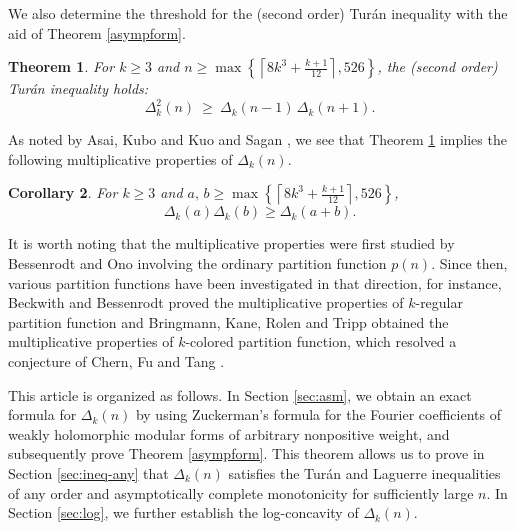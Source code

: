 \documentclass[12pt]{article}
\newtheorem{thm}{Theorem}[section]
\newtheorem{cor}[thm]{Corollary}
\numberwithin{equation}{section}
\begin{document}
We also determine the threshold
for the (second order) Tur\'an inequality with the aid of Theorem \ref{asympform}.
\begin{thm}\label{thm:main}
For $k\ge3$ and $
n\ge \max\left\{\left\lceil
8k^{3}+\frac{k+1}{12}\right\rceil,526\right\}
$, the (second order) Tur\'an inequality holds:
\[
\Delta_k^2(n)\ \ge\ \Delta_k(n-1)\,\Delta_k(n+1).
\]
\end{thm}


As noted by Asai, Kubo and Kuo \cite{Asai-Kubo-Kuo-00} and Sagan \cite{Sagan-1988}, we see that Theorem \ref{thm:main} implies the following multiplicative properties of $\Delta_{k}(n)$.

\begin{cor}\label{thm-Delta-2}
For $k\geq 3$ and   $a,\,b\ge \max\left\{\left\lceil
8k^{3}+\frac{k+1}{12}\right\rceil,526\right\}
$,
\begin{equation*}
\Delta_{k}(a)\Delta_{k}(b)\ge\Delta_{k}(a+b).
\end{equation*}
\end{cor}
It is worth noting that the multiplicative properties were first studied by Bessenrodt and Ono \cite{Bessenrodt-Ono-2016} involving the ordinary partition function $p(n)$. Since then, various partition functions have been investigated in that direction, for instance,
Beckwith and Bessenrodt  \cite{Beckwith-Bessenrodt-2016} proved the multiplicative properties of  $k$-regular partition function  and   Bringmann, Kane, Rolen and Tripp \cite{Bringmann-Kane-Rolen-Tripp-2021}  obtained the multiplicative properties of $k$-colored partition function, which resolved a conjecture of Chern, Fu and Tang \cite{Chern-Fu-Tang-2018}.



This article is organized as follows. In Section \ref{sec:asm}, we obtain an exact formula for $\Delta_{k}(n)$ by using Zuckerman's formula for the Fourier coefficients of weakly holomorphic modular forms of arbitrary nonpositive weight, and subsequently prove Theorem \ref{asympform}. This theorem allows us to prove in Section \ref{sec:ineq-any} that $\Delta_{k}(n)$ satisfies the Tur\'an and Laguerre inequalities of any order and asymptotically complete monotonicity for sufficiently large $n$. In Section \ref{sec:log}, we further establish the log-concavity of $\Delta_{k}(n)$.
\end{document}
